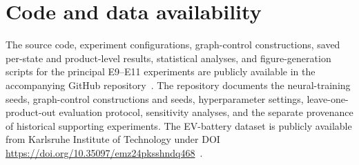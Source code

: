 \section*{Code and data availability}
The source code, experiment configurations, graph-control constructions, saved per-state and product-level results, statistical analyses, and figure-generation scripts for the principal E9--E11 experiments are publicly available in the accompanying GitHub repository~\cite{GraphEVRepo}. The repository documents the neural-training seeds, graph-control constructions and seeds, hyperparameter settings, leave-one-product-out evaluation protocol, sensitivity analyses, and the separate provenance of historical supporting experiments. The EV-battery dataset is publicly available from Karlsruhe Institute of Technology under DOI \url{https://doi.org/10.35097/emz24pksshndq468}~\cite{Baucks2026Dataset}.
